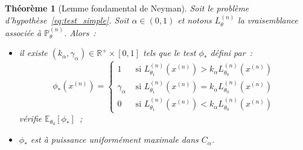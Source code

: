 \documentclass{report}
\renewcommand{\P}{\mathbb P}
\newcommand{\E}{\mathbb E}
\newcommand{\R}{\mathbb R}
\newcommand{\n}{{(n)}}
\newtheorem{thm}{Théorème}[chapter]
\theoremstyle{definition}
\theoremstyle{remark}
\begin{document}
		\begin{thm}[Lemme fondamental de Neyman]\label{thm:test_simple} Soit le problème d'hypothèse~\eqref{eq:test_simple}. Soit $\alpha \in (0, 1)$ et notons
		$L_\theta^\n$ la vraisemblance associée à $\P_\theta^\n$. Alors~:
		\begin{itemize}
			\item[$(i)$]  il existe $(k_\alpha, \gamma_\alpha) \in \R^+ \times [0, 1]$ tels que le test $\phi_*$ défini par~:
			\[\phi_*(x^\n) =
			\begin{cases}
				1 &\text{ si } L_{\theta_1}^\n(x^\n) > k_\alpha L_{\theta_0}^\n(x^\n) \\
				\gamma_\alpha &\text{ si } L_{\theta_1}^\n(x^\n) = k_\alpha L_{\theta_0}^\n(x^\n) \\
				0 &\text{ si } L_{\theta_1}^\n(x^\n) < k_\alpha L_{\theta_0}^\n(x^\n)
			\end{cases}\]
			vérifie $\E_{\theta_0}[\phi_*]$~;

			\item $\phi_*$ est à puissance uniformément maximale dans $C_\alpha$.
		\end{itemize}
		\end{thm}
\end{document}
